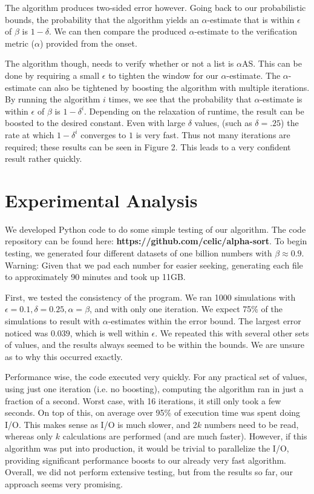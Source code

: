 \documentclass[11pt]{article}
\begin{document}
The algorithm produces two-sided error however. Going back to our probabilistic bounds, the probability that the algorithm yields an $\alpha$-estimate that is within $\epsilon$ of $\beta$ is $1 - \delta$. We can then compare the produced $\alpha$-estimate to the verification metric ($\alpha$) provided from the onset. 

The algorithm though, needs to verify whether or not a list is $\alpha$AS. This can be done by requiring a small $\epsilon$ to tighten the window for our $\alpha$-estimate. The $\alpha$-estimate can also be tightened by boosting the algorithm with multiple iterations. By running the algorithm $i$ times, we see that the probability that $\alpha$-estimate is within $\epsilon$ of $\beta$ is $1 - \delta^i$. Depending on the relaxation of runtime, the result can be boosted to the desired constant. Even with large $\delta$ values, (such as $\delta = .25$) the rate at which $1 - \delta^i$ converges to $1$ is very fast. Thus not many iterations are required; these results can be seen in Figure 2. This leads to a very confident result rather quickly.

\section{Experimental Analysis}

We developed Python code to do some simple testing of our algorithm. The code repository can be found here: \textbf{https://github.com/celic/alpha-sort}. To begin testing, we generated four different datasets of one billion numbers with $\beta \approx 0.9$. Warning: Given that we pad each number for easier seeking, generating each file to approximately 90 minutes and took up 11GB. 

First, we tested the consistency of the program. We ran 1000 simulations with $\epsilon=0.1, \delta=0.25, \alpha=\beta$, and with only one iteration. We expect 75\% of the simulations to result with $\alpha$-estimates within the error bound. The largest error noticed was $0.039$, which is well within $\epsilon$. We repeated this with several other sets of values, and the results always seemed to be within the bounds. We are unsure as to why this occurred exactly.

Performance wise, the code executed very quickly. For any practical set of values, using just one iteration (i.e. no boosting), computing the algorithm ran in just a fraction of a second. Worst case, with 16 iterations, it still only took a few seconds. On top of this, on average over 95\% of execution time was spent doing I/O. This makes sense as I/O is much slower, and $2k$ numbers need to be read, whereas only $k$ calculations are performed (and are much faster). However, if this algorithm was put into production, it would be trivial to parallelize the I/O, providing significant performance boosts to our already very fast algorithm. Overall, we did not perform extensive testing, but from the results so far, our approach seems very promising.
\end{document}
